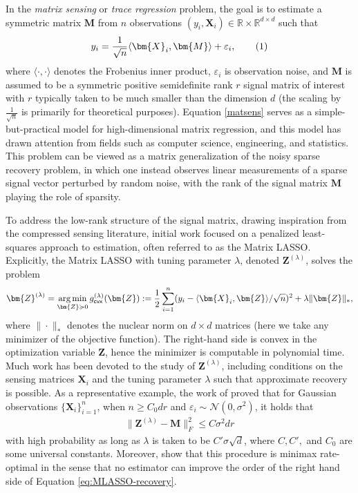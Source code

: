 \documentclass[10pt]{article}
\newcommand\numberthis{\addtocounter{equation}{1}\tag{\theequation}}
\DeclareMathOperator*{\argmin}{arg\,min}
\newcommand{\eps}{\ensuremath{\varepsilon}}
\theoremstyle{definition}
\begin{document}
In the \emph{matrix sensing} or \emph{trace regression} problem, the goal is to estimate a symmetric matrix $\bm{M}$ from $n$ observations  $(y_i,\bm{X}_i) \in \mathbb{R} \times \mathbb{R}^{d\times d}$ such that
\begin{align}
    y_i = \frac{1}{\sqrt{n}}\langle \bm{X}_i, \bm{M} \rangle + \eps_i, \numberthis \label{matsens}
\end{align}
where $\langle \cdot, \cdot \rangle$ denotes the Frobenius inner product, $\eps_i$ is observation noise, and $\bm{M}$ is assumed to be a symmetric positive semidefinite rank $r$ signal matrix of interest with $r$ typically taken to be much smaller than the dimension $d$ (the scaling by $\frac{1}{\sqrt{n}}$ is primarily for theoretical purposes). Equation \eqref{matsens}  serves as a simple-but-practical model for high-dimensional matrix regression, and this model has drawn attention from fields such as computer science, engineering, and statistics.   This problem can be viewed as a matrix generalization of the noisy sparse recovery problem, in which one instead observes linear measurements of a sparse signal vector  perturbed by random noise, with the rank of the signal matrix $\bm{M}$ playing the role of sparsity.  


To address the low-rank structure of the signal matrix, drawing inspiration from the compressed sensing literature, initial work focused on a penalized least-squares approach to estimation, often referred to as the Matrix LASSO.
Explicitly,  the Matrix LASSO with tuning parameter $\lambda$, denoted $\bm{Z}^{(\lambda)}$, solves the problem
\begin{align}
    \bm{Z}^{(\lambda)} = \argmin_{\bm{Z} \succcurlyeq 0} g_{\sf cvx}^{(\lambda)}(\bm{Z}) :=  \frac{1}{2} \sum_{i=1}^{n} (y_i - \langle \bm{X}_i, \bm{Z}\rangle/\sqrt{n} )^2 + \lambda \| \bm{Z} \|_*,
\end{align}
where $\|\cdot\|_*$ denotes the nuclear norm on $d\times d$ matrices (here we take any minimizer of the objective function).  
The right-hand side is convex in the optimization variable $\bm{Z}$, hence the minimizer is computable in polynomial time. Much work has been devoted to the study of $\bm{Z}^{(\lambda)}$, including conditions on the sensing matrices $\bm{X}_i$ and the tuning parameter $\lambda$ such that approximate recovery is possible.  As a representative example, the work of \citet{candes_tight_2011} proved that for Gaussian observations $\{\bm{X}_i\}_{i=1}^{n}$, when $n \geq C_0 dr$ and $\eps_i \sim \mathcal{N}(0,\sigma^2)$, it holds that 
\begin{align}
\label{eq:MLASSO-recovery}
    \| \bm{Z}^{(\lambda)} - \bm{M}\|_F^2 \leq C \sigma^2 dr
\end{align}
with high probability as long as $\lambda$ is taken to be $C' \sigma \sqrt{d}$, where $C, C',$ and $C_0$  are some universal constants.  Moreover, \citet{candes_tight_2011} show that this procedure is minimax rate-optimal in the sense that no estimator can improve the order of the right hand side of Equation \eqref{eq:MLASSO-recovery}.  
\end{document}
